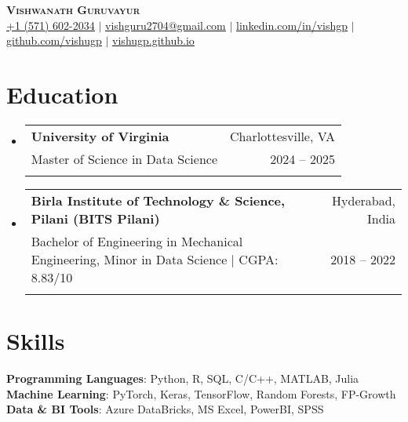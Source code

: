 \documentclass[letter paper,11pt]{article}
\makeatletter
\newcommand{\resumeSubheading}[5]{%
  \item
    \begin{tabular*}
    {1\textwidth}
    {l@{\extracolsep{\fill}}r}
      \textbf{#1} & \small#2 \\
      {\small#3} & {\small #4} \\
      {\small#5}
    \end{tabular*}%
  \vspace{-0.8cm}
}
\newcommand{\resumeSubHeadingListStart}{\begin{itemize}[leftmargin=0.0in, label={}]}
\newcommand{\resumeSubHeadingListEnd}{\end{itemize}}
\makeatother
\begin{document}


\begin{center}
    \textbf{\Huge \scshape Vishwanath Guruvayur} \\ 
    \vspace{7pt}
    \small 
    \href{tel:+1 (571) 602-2034}{\underline{+1 (571) 602-2034}} $|$ \href{mailto:vishvesh2704@gmail.com}{\underline{vishguru2704@gmail.com}} $|$ 
    \href{https://linkedin.com/in/vishgp}{\underline{linkedin.com/in/vishgp}} $|$
    \href{https://github.com/vishugp}{\underline{github.com/vishugp}} $|$
    \href{https://vishugp.github.io}{\underline{vishugp.github.io}}
\end{center}


\section{Education}
    \resumeSubHeadingListStart
    \resumeSubheading
         {\textbf{University of Virginia}}{Charlottesville, VA}
        {Master of Science in Data Science}{2024 -- 2025}{}

 \vspace{0.2cm}
        
    \resumeSubheading
        {\textbf{Birla Institute of Technology \& Science, Pilani (BITS Pilani)}}{Hyderabad, India}
        {Bachelor of Engineering in Mechanical Engineering, Minor in Data Science $|$ CGPA: 8.83/10}{2018 -- 2022}{}


 \resumeSubHeadingListEnd 
%
\section{Skills}
 \begin{itemize}[leftmargin=0.00in, label={}]
    \small{\item{
     \textbf{Programming Languages}{: Python, R, SQL, C/C++, MATLAB, Julia} \\
     \textbf{Machine Learning}{: PyTorch, Keras, TensorFlow, Random Forests, FP-Growth} \\
     \textbf{Data \& BI Tools}{: Azure DataBricks, MS Excel, PowerBI, SPSS}
    }}
 \end{itemize}
 
\end{document}
